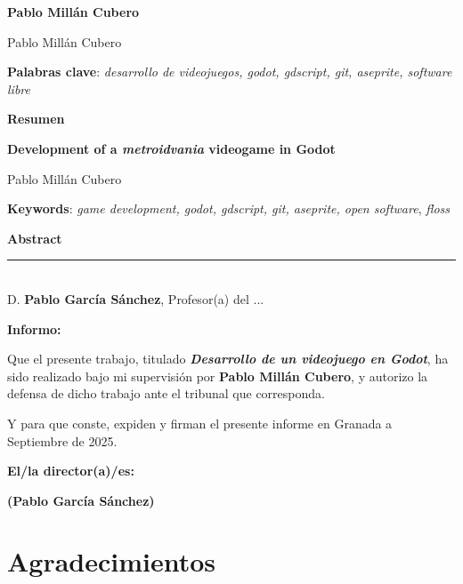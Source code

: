 \thispagestyle{empty}

\begin{center}
{\large\bfseries Pablo Millán Cubero }\\
\end{center}
\begin{center}
Pablo Millán Cubero\\
\end{center}


\vspace{0.5cm}
\noindent\textbf{Palabras clave}: \textit{desarrollo de videojuegos, godot, gdscript, git, aseprite, software libre}
\vspace{0.7cm}

\noindent\textbf{Resumen}\\
	

\cleardoublepage

\begin{center}
	{\large\bfseries Development of a \textit{metroidvania} videogame in Godot}\\
\end{center}
\begin{center}
	Pablo Millán Cubero\\
\end{center}
\vspace{0.5cm}
\noindent\textbf{Keywords}: \textit{game development, godot, gdscript, git, aseprite, open software}, \textit{floss}
\vspace{0.7cm}

\noindent\textbf{Abstract}\\


\cleardoublepage

\thispagestyle{empty}

\noindent\rule[-1ex]{\textwidth}{2pt}\\[4.5ex]

D. \textbf{Pablo García Sánchez}, Profesor(a) del ...

\vspace{0.5cm}

\textbf{Informo:}

\vspace{0.5cm}

Que el presente trabajo, titulado \textit{\textbf{Desarrollo de un videojuego en Godot}},
ha sido realizado bajo mi supervisión por \textbf{Pablo Millán Cubero}, y autorizo la defensa de dicho trabajo ante el tribunal
que corresponda.

\vspace{0.5cm}

Y para que conste, expiden y firman el presente informe en Granada a Septiembre de 2025.

\vspace{1cm}

\textbf{El/la director(a)/es: }

\vspace{5cm}

\noindent \textbf{(Pablo García Sánchez)}

\chapter*{Agradecimientos}




